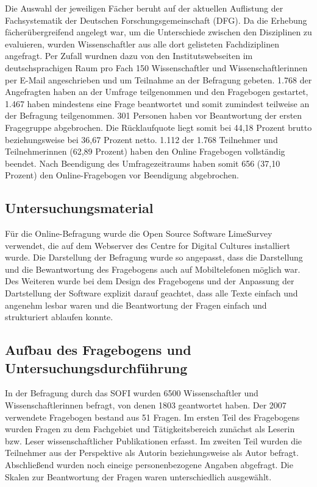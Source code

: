 Die Auswahl der jeweiligen Fächer beruht auf der aktuellen Auflistung der Fachsystematik der Deutschen Forschungsgemeinschaft (DFG). Da die Erhebung fächerübergreifend angelegt war, um die Unterschiede zwischen den Disziplinen zu evaluieren, wurden Wissenschaftler aus alle dort gelisteten Fachdiziplinen angefragt. Per Zufall wurdnen dazu von den Institutswebseiten im deutschsprachigen Raum pro Fach 150 Wissenschaftler und Wissenschaftlerinnen per E-Mail angeschrieben und um Teilnahme an der Befragung gebeten. 1.768 der Angefragten haben an der Umfrage teilgenommen und den Fragebogen gestartet, 1.467 haben mindestens eine Frage beantwortet und somit zumindest teilweise an der Befragung teilgenommen. 301 Personen haben vor Beantwortung der ersten Fragegruppe abgebrochen. Die Rücklaufquote liegt somit bei 44,18 Prozent brutto beziehungsweise bei 36,67 Prozent netto. 1.112 der 1.768 Teilnehmer und Teilnehmerinnen (62,89 Prozent) haben den Online Fragebogen vollständig beendet. Nach Beendigung des Umfragezeitraums haben somit 656 (37,10 Prozent) den Online-Fragebogen vor Beendigung abgebrochen. 

\subsection{Untersuchungsmaterial}

Für die Online-Befragung wurde die Open Source Software LimeSurvey verwendet, die auf dem Webserver des Centre for Digital Cultures installiert wurde. Die Darstellung der Befragung wurde so angepasst, dass die Darstellung und die Bewantwortung des Fragebogens auch auf Mobiltelefonen möglich war. Des Weiteren wurde bei dem Design des Fragebogens und der Anpassung der Dartstellung der Software explizit darauf geachtet, dass alle Texte einfach und angenehm lesbar waren und die Beantwortung der Fragen einfach und strukturiert ablaufen konnte.

\subsection{Aufbau des Fragebogens und Untersuchungsdurchführung}

In der Befragung durch das SOFI wurden 6500 Wissenschaftler und Wissenschaftlerinnen befragt, von denen 1803 geantwortet haben. Der 2007 verwendete Fragebogen bestand aus 51 Fragen. Im ersten Teil des Fragebogens wurden Fragen zu dem Fachgebiet und Tätigkeitsbereich zunächst als Leserin bzw. Leser wissenschaftlicher Publikationen erfasst. Im zweiten Teil wurden die Teilnehmer aus der Perspektive als Autorin beziehungsweise als Autor befragt. Abschließend wurden noch eineige personenbezogene Angaben abgefragt. \cite{Hanekop_Wittke_2007_Fragebogen} Die Skalen zur Beantwortung der Fragen waren unterschiedlich ausgewählt. 

